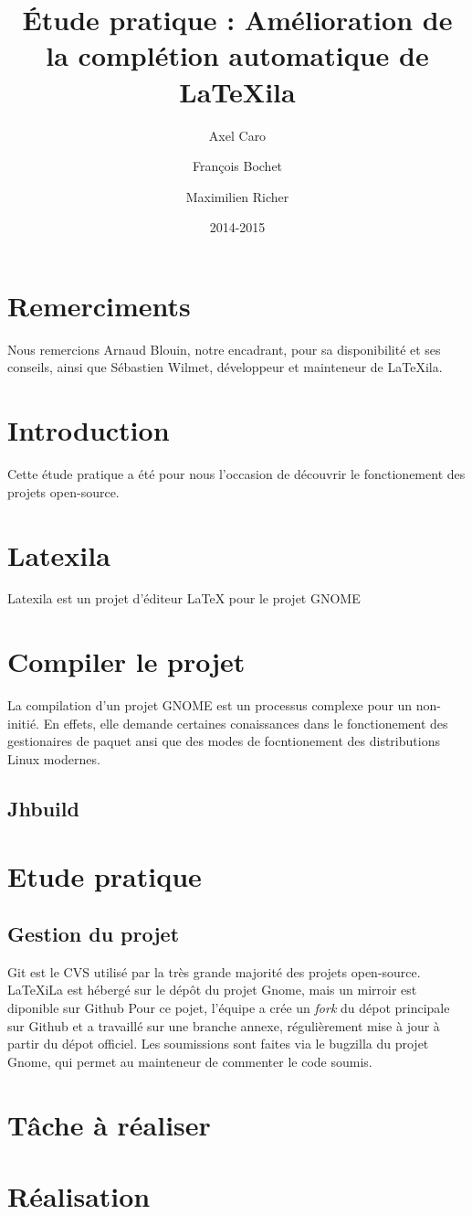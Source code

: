 \documentclass[a4paper,11pt]{report}
\title{Étude pratique : Amélioration de la complétion automatique de LaTeXila}
\author{Axel Caro\and François Bochet\and Maximilien Richer}
\date{2014-2015}
\begin{document}
\maketitle %
\tableofcontents %

\section{Remerciments} %
\label{cha:remerciments}
Nous remercions Arnaud Blouin, notre encadrant, pour sa disponibilité et ses conseils, ainsi que Sébastien Wilmet, développeur et mainteneur de LaTeXila.

\section{Introduction}
\label{cha:Introduction}
Cette étude pratique a été pour nous l'occasion de découvrir le fonctionement des projets open-source.

\section{Latexila}
\label{sec:latexila}

Latexila est un projet d'éditeur LaTeX pour le projet GNOME

\section{Compiler le projet}
\label{sec:compiler}
La compilation d'un projet GNOME est un processus complexe pour un non-initié. En effets, elle demande certaines conaissances dans le fonctionement des gestionaires de paquet ansi que des modes de focntionement des distributions Linux modernes.

\subsection{Jhbuild}
\label{sub:jhbuild}

\section{Etude pratique} %
\label{cha:etude_pratique}

\subsection{Gestion du projet} %
\label{sub:git}
Git est le CVS utilisé par la très grande majorité des projets open-source. LaTeXiLa est hébergé sur le dépôt du projet Gnome, mais un mirroir est diponible sur Github %
Pour ce pojet, l'équipe a crée un \textit{fork} du dépot principale sur Github et a travaillé sur une branche annexe, régulièrement mise à jour à partir du dépot officiel.
Les soumissions sont faites via le bugzilla du projet Gnome, qui permet au mainteneur de commenter le code soumis.

\section{Tâche à réaliser} %
\label{sec:tache_a_realiser}

\section{Réalisation}

\end{document}
